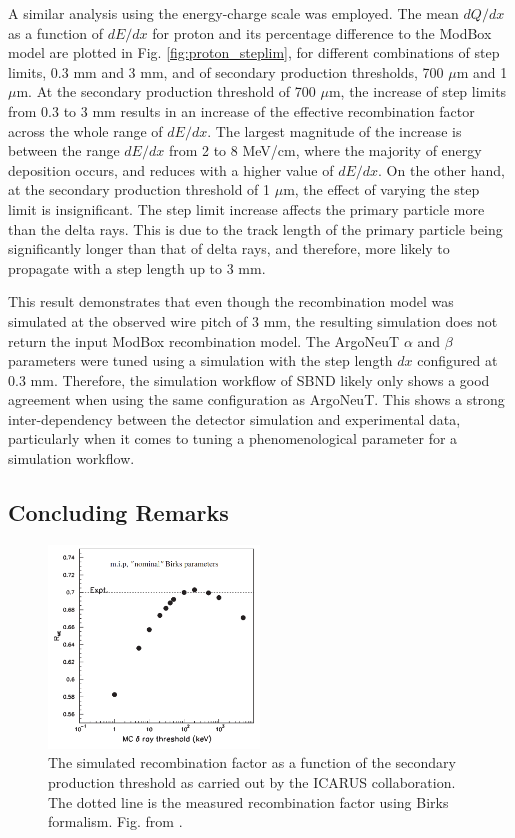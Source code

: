 A similar analysis using the energy-charge scale was employed.
The mean $dQ/dx$ as a function of $dE/dx$ for proton and its percentage difference to the ModBox model are plotted in Fig. \ref{fig:proton_steplim}, for different combinations of step limits, 0.3 mm and 3 mm, and of secondary production thresholds, 700 $\mu$m and 1 $\mu$m.
At the secondary production threshold of 700 $\mu$m, the increase of step limits from 0.3 to 3 mm results in an increase of the effective recombination factor across the whole range of $dE/dx$.
The largest magnitude of the increase is between the range $dE/dx$ from 2 to 8 MeV/cm, where the majority of energy deposition occurs, and reduces with a higher value of $dE/dx$. 
On the other hand, at the secondary production threshold of 1 $\mu$m, the effect of varying the step limit is insignificant.
The step limit increase affects the primary particle more than the delta rays.
This is due to the track length of the primary particle being significantly longer than that of delta rays, and therefore, more likely to propagate with a step length up to 3 mm.

This result demonstrates that even though the recombination model was simulated at the observed wire pitch of 3 mm, the resulting simulation does not return the input ModBox recombination model.
The ArgoNeuT $\alpha$ and $\beta$ parameters were tuned using a simulation with the step length $dx$ configured at 0.3 mm.
Therefore, the simulation workflow of SBND likely only shows a good agreement when using the same configuration as ArgoNeuT.
This shows a strong inter-dependency between the detector simulation and experimental data, particularly when it comes to tuning a phenomenological parameter for a simulation workflow.

\subsection{Concluding Remarks}

\label{sec:concludeDeltaRay}

\begin{figure}[bp!]
\centering 
\includegraphics[width=0.5\textwidth]{icarus_recomb}
\caption{
The simulated recombination factor as a function of the secondary production threshold as carried out by the ICARUS collaboration.
The dotted line is the measured recombination factor using Birks formalism. 
Fig. from \cite{icarus_recomb}.
}
\label{fig:icarus_recomb}
\end{figure}

